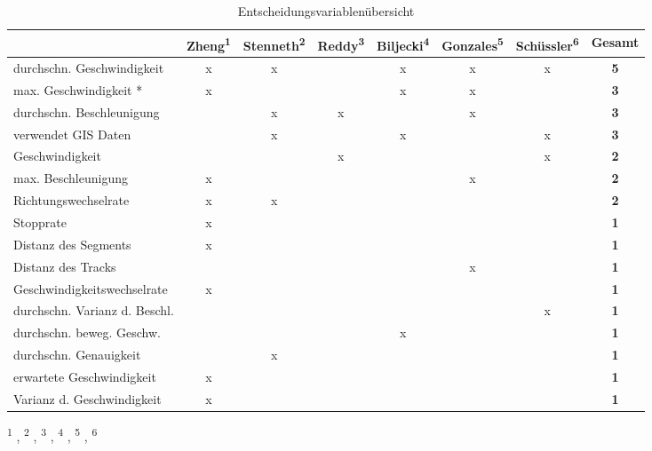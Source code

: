 \begin{landscape}
\begin{table}[h]
\centering
\begin{tabular}{|l|c|c|c|c|c|c|c|}
\hline
 & \multicolumn{1}{l|}{Zheng\textsuperscript{1}} & \multicolumn{1}{l|}{Stenneth\textsuperscript{2}} & \multicolumn{1}{l|}{Reddy\textsuperscript{3}} & \multicolumn{1}{l|}{Biljecki\textsuperscript{4}} & \multicolumn{1}{l|}{Gonzales\textsuperscript{5}} & \multicolumn{1}{l|}{Schüssler\textsuperscript{6}} & \multicolumn{1}{l|}{\textbf{Gesamt}} \\ \hline
durchschn. Geschwindigkeit & x & x &  & x & x & x & \textbf{5} \\ \hline
max. Geschwindigkeit * & x &  &  & x & x &  & \textbf{3} \\ \hline
durchschn. Beschleunigung &  & x & x &  & x &  & \textbf{3} \\ \hline
verwendet GIS Daten &  & x &  & x &  & x & \textbf{3} \\ \hline
Geschwindigkeit &  &  & x &  &  & x & \textbf{2} \\ \hline
max. Beschleunigung & x &  &  &  & x &  & \textbf{2} \\ \hline
Richtungswechselrate & x & x &  &  &  &  & \textbf{2} \\ \hline
Stopprate & x &  &  &  &  &  & \textbf{1} \\ \hline
Distanz des Segments & x &  &  &  &  &  & \textbf{1} \\ \hline
Distanz des Tracks &  &  &  &  & x &  & \textbf{1} \\ \hline
Geschwindigkeitswechselrate & x &  &  &  &  &  & \textbf{1} \\ \hline
durchschn. Varianz d. Beschl. &  &  &  &  &  & x & \textbf{1} \\ \hline
durchschn. beweg. Geschw. &  &  &  & x &  &  & \textbf{1} \\ \hline
durchschn. Genauigkeit &  & x &  &  &  &  & \textbf{1} \\ \hline
erwartete Geschwindigkeit & x &  &  &  &  &  & \textbf{1} \\ \hline
Varianz d. Geschwindigkeit & x &  &  &  &  &  & \textbf{1} \\ \hline
\end{tabular}
\caption{Entscheidungsvariablenübersicht}
\textsuperscript{1} \cite{zheng_understanding_2010}, \textsuperscript{2} \cite{stenneth_transportation_2011}, \textsuperscript{3} \cite{reddy_using_2010}, \textsuperscript{4} \cite{biljecki_transportation_2013}, \textsuperscript{5} \cite{gonzalez_automating_2010}, \textsuperscript{6} \cite{nadine_schussler_improving_2011}
\label{variablenuebersicht}
\end{table}
\end{landscape}

